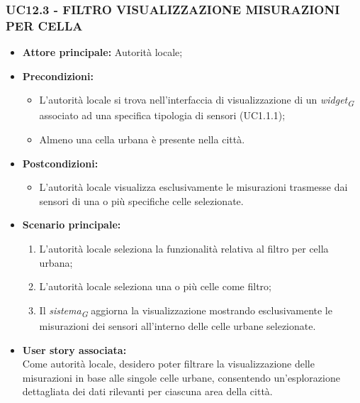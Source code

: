 \subsubsection{UC12.3 - FILTRO VISUALIZZAZIONE MISURAZIONI PER CELLA}
\begin{itemize}
    \item \textbf{Attore principale:} Autorità locale;
    \item \textbf{Precondizioni:}
        \begin{itemize}
            \item L'autorità locale si trova nell'interfaccia di visualizzazione di un \textit{widget}\textsubscript{\textit{G}} associato ad una specifica tipologia di sensori (UC1.1.1);
            \item Almeno una cella urbana è presente nella città. 
        \end{itemize}
    \item \textbf{Postcondizioni:}
          \begin{itemize}
              \item L'autorità locale visualizza esclusivamente le misurazioni trasmesse dai sensori di una o più specifiche celle selezionate.
          \end{itemize}
    \item \textbf{Scenario principale:}
          \begin{enumerate}
              \item L'autorità locale seleziona la funzionalità relativa al filtro per cella urbana;
              \item L'autorità locale seleziona una o più celle come filtro;
              \item Il \textit{sistema}\textsubscript{\textit{G}} aggiorna la visualizzazione mostrando esclusivamente le misurazioni dei sensori all'interno delle celle urbane selezionate.
          \end{enumerate}
    \item \textbf{User story associata:} \\
        Come autorità locale, desidero poter filtrare la visualizzazione delle misurazioni in base alle singole celle urbane, consentendo un'esplorazione dettagliata dei dati rilevanti per ciascuna area della città.
\end{itemize}
